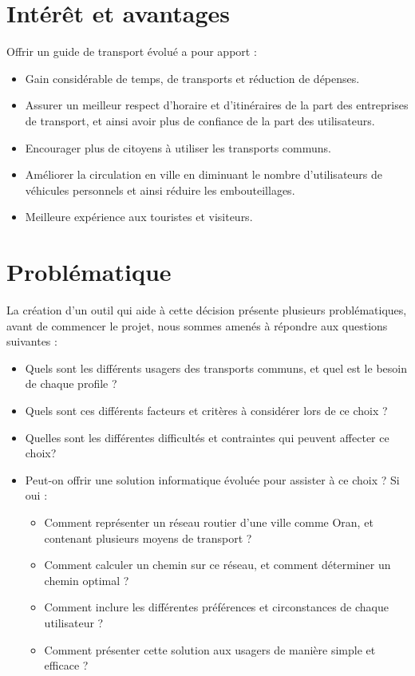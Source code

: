 \section{Intérêt et avantages}
Offrir un guide de transport évolué a pour apport :
\begin{itemize}
	\item Gain considérable de temps, de transports et réduction de dépenses.
	\item Assurer un meilleur respect d'horaire et d'itinéraires de la part des entreprises de transport, et ainsi avoir plus de confiance de la part des utilisateurs.
	\item Encourager plus de citoyens à utiliser les transports communs.
	\item Améliorer la circulation en ville en diminuant le nombre d'utilisateurs de véhicules personnels et ainsi réduire les embouteillages.
	\item Meilleure expérience aux touristes et visiteurs.
\end{itemize}

\section{Problématique}

La création d'un outil qui aide à cette décision présente plusieurs problématiques, avant de commencer le projet, nous sommes amenés à répondre aux questions suivantes :
\begin{itemize}
	\item Quels sont les différents usagers des transports communs, et quel est le besoin de chaque profile ?
	\item Quels sont ces différents facteurs et critères à considérer lors de ce choix ?
	\item Quelles sont les différentes difficultés et contraintes qui peuvent affecter ce choix?
	\item Peut-on offrir une solution informatique évoluée pour assister à ce choix ? Si oui : 
	      \begin{itemize}
	      	\item Comment représenter un réseau routier d'une ville comme Oran, et contenant plusieurs moyens de transport ?
	      	\item Comment calculer un chemin sur ce réseau, et comment déterminer un chemin optimal ?
	      	\item Comment inclure les différentes préférences et circonstances de chaque utilisateur ?
	      	\item Comment présenter cette solution aux usagers de manière simple et efficace ?
	      \end{itemize}
\end{itemize}
			
